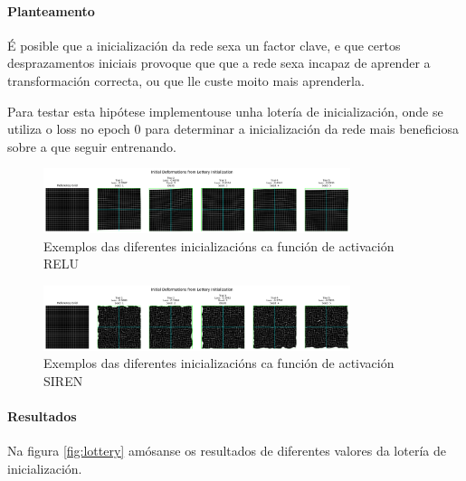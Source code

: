 \paragraph{Planteamento}
\label{par:Planteamento-initialization}

É posible que a inicialización da rede sexa un factor clave, e que certos desprazamentos iniciais provoque que que a rede sexa incapaz de aprender a transformación correcta, ou que lle custe moito mais aprenderla.

Para testar esta hipótese implementouse unha lotería de inicialización, onde se utiliza o loss no epoch 0 para determinar a inicialización da rede mais beneficiosa sobre a que seguir entrenando.


\begin{figure}[ht]
    \centering
    \includegraphics[width=0.8\textwidth]{imaxes/lottery/initial_deformations_combinedMLP.png}
    \caption{Exemplos das diferentes inicializacións ca función de activación RELU}
    \label{fig:lottery_initial_deformations_combinedMLP}
\end{figure}

\begin{figure}[ht]
    \centering
    \includegraphics[width=0.8\textwidth]{imaxes/lottery/initial_deformations_combinedSIREN.png}
    \caption{Exemplos das diferentes inicializacións ca función de activación SIREN}
    \label{fig:lottery_initial_deformations_combinedSIREN}
\end{figure}

\FloatBarrier

\paragraph{Resultados}
\label{par:Resultados-initialization}


Na figura \ref{fig:lottery} amósanse os resultados de diferentes valores da lotería de inicialización.


